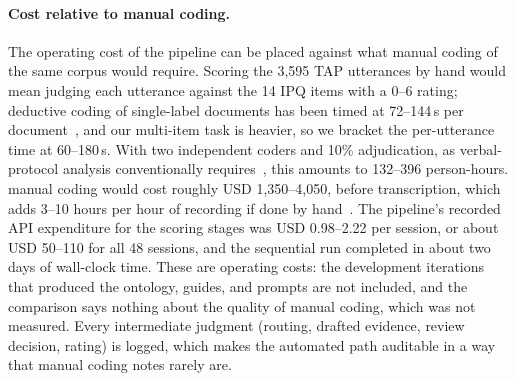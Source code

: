 \paragraph{Cost relative to manual coding.}
The operating cost of the pipeline can be placed against what manual coding of the same corpus would require. Scoring the 3{,}595 TAP utterances by hand would mean judging each utterance against the 14 IPQ items with a $0$--$6$ rating; deductive coding of single-label documents has been timed at 72--144\,s per document~\cite{chew2023llm}, and our multi-item task is heavier, so we bracket the per-utterance time at 60--180\,s. With two independent coders and 10\% adjudication, as verbal-protocol analysis conventionally requires~\cite{chi1997quantifying}, this amounts to 132--396 person-hours. manual coding would cost roughly USD 1{,}350--4{,}050, before transcription, which adds 3--10 hours per hour of recording if done by hand~\cite{bailey2008transcribing}. The pipeline's recorded API expenditure for the scoring stages was USD 0.98--2.22 per session, or about USD 50--110 for all 48 sessions, and the sequential run completed in about two days of wall-clock time. These are operating costs: the development iterations that produced the ontology, guides, and prompts are not included, and the comparison says nothing about the quality of manual coding, which was not measured. Every intermediate judgment (routing, drafted evidence, review decision, rating) is logged, which makes the automated path auditable in a way that manual coding notes rarely are.
